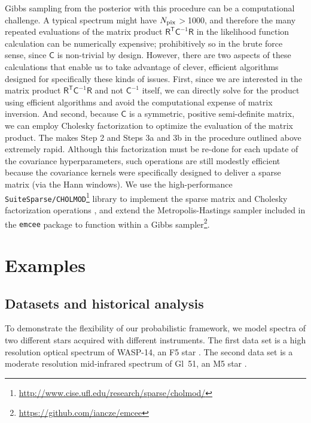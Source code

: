 \documentclass[iop,floatfix]{emulateapj}
\newcommand{\vR}{\mathsf{R}}
\newcommand{\vC}{\mathsf{C}}
\newcommand{\trans}{\mathsf{T}}
\begin{document}
Gibbs sampling from the posterior with this procedure can be a computational
challenge.  A typical spectrum might have $N_{\rm pix}$$>$1000, and therefore
the many repeated evaluations of the matrix product $\vR^{\trans} \vC^{-1} \vR$
in the likelihood function calculation can be numerically expensive;
prohibitively so in the brute force sense, since $\vC$ is non-trivial by
design.  However, there are two aspects of these calculations that enable us to
take advantage of clever, efficient algorithms designed for specifically these
kinds of issues.  First, since we are interested in the matrix product
$\vR^{\trans} \vC^{-1} \vR$ and not $\vC^{-1}$ itself, we can directly solve for the product using efficient algorithms and avoid the computational expense of
matrix inversion. And second, because
$\vC$ is a symmetric, positive semi-definite matrix, we can employ Cholesky factorization
to optimize the evaluation of the matrix product.  The makes Step 2 and Steps
3a and 3b in the procedure outlined above extremely rapid.  Although this
factorization must be re-done for each update of the covariance
hyperparameters, such operations are still modestly efficient because the
covariance kernels were specifically designed to deliver a sparse matrix (via
the Hann windows).  We use the high-performance
\texttt{SuiteSparse/CHOLMOD}\footnote{\url{http://www.cise.ufl.edu/research/sparse/cholmod/}}
library to implement the sparse matrix and Cholesky factorization operations
\citep{chen08,davis09}, and extend the Metropolis-Hastings sampler included in
the {\tt emcee} package \citep{foreman-mackey13} to function within a Gibbs sampler\footnote{\url{https://github.com/iancze/emcee}}.


\section{Examples}
\label{sec:examples}

\subsection{Datasets and historical analysis}
To demonstrate the flexibility of our probabilistic framework, we model spectra of two different stars acquired with different instruments. The first data set is a high resolution optical spectrum of WASP-14, an F5 star \citep{joshi09}. The second data set is a moderate resolution mid-infrared spectrum of Gl~51, an M5 star \citep{rojas-ayala12}. 
\end{document}
